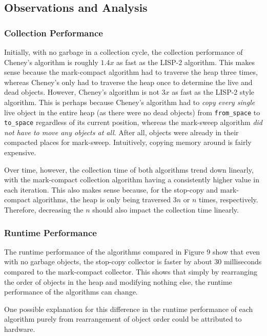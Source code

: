 \documentclass[index]{subfiles}
\begin{document}
\subsection{Observations and Analysis}

\subsubsection{Collection Performance}

Initially, with no garbage in a collection cycle, the collection performance of Cheney's algorithm is roughly \(1.4x\) as fast as the LISP-2 algorithm. This makes sense because the mark-compact algorithm had to traverse the heap three times, whereas Cheney's only had to traverse the heap once to determine the live and dead objects. However, Cheney's algorithm is not \(3x\) as fast as the LISP-2 style algorithm. This is perhaps because Cheney's algorithm had to \textit{copy every single} live object in the entire heap (as there were no dead objects) from \verb+from_space+ to \verb+to_space+ regardless of its current position, whereas the mark-sweep algorithm \textit{did not have to move any objects at all}. After all, objects were already in their compacted places for mark-sweep. Intuitively, copying memory around is fairly expensive.

Over time, however, the collection time of both algorithms trend down linearly, with the mark-compact collection algorithm having a consistently higher value in each iteration. This also makes sense because, for the stop-copy and mark-compact algorithms, the heap is only being traversed \(3n\) or \(n\) times, respectively. Therefore, decreasing the \(n\) should also impact the collection time linearly.

\subsubsection{Runtime Performance}

The runtime performance of the algorithms compared in Figure 9 show that even with no garbage objects, the stop-copy collector is faster by about 30 milliseconds compared to the mark-compact collector. This shows that simply by rearranging the order of objects in the heap and modifying nothing else, the runtime performance of the algorithms can change.

One possible explanation for this difference in the runtime performance of each algorithm purely from rearrangement of object order could be attributed to hardware.
\end{document}
